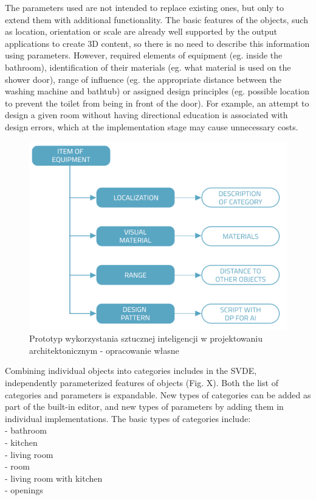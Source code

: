 \documentclass[runningheads]{llncs}
\begin{document}
The parameters used are not intended to replace existing ones, but only to extend them with additional functionality. The basic features of the objects, such as location, orientation or scale are already well supported by the output applications to create 3D content, so there is no need to describe this information using parameters. However, required elements of equipment (eg. inside the bathroom), identification of their materials (eg. what material is used on the shower door), range of influence (eg. the appropriate distance between the washing machine and bathtub) or assigned design principles (eg. possible location to prevent the toilet from being in front of the door). For example, an attempt to design a given room without having directional education is associated with design errors, which at the implementation stage may cause unnecessary costs. 

\begin{figure}[H]
\centering
\includegraphics[width=\textwidth]{graf.png}
\caption{Prototyp wykorzystania sztucznej inteligencji w projektowaniu architektonicznym - 
opracowanie własne} \label{fig1}
\end{figure}

Combining individual objects into categories includes in the SVDE, independently parameterized features of objects (Fig. X). Both the list of categories and parameters is expandable. New types of categories can be added as part of the built-in editor, and new types of parameters by adding them in individual implementations.
The basic types of categories include:\\
- bathroom\\
- kitchen\\
- living room\\
- room\\
- living room with kitchen\\
- openings\\
\end{document}
